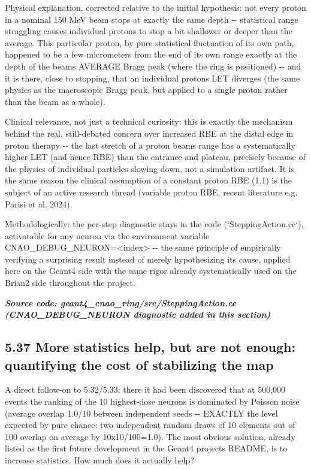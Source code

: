 \documentclass[
  english,
]{article}
\begin{document}
Physical explanation, corrected relative to the initial hypothesis: not every proton in a nominal 150 MeV beam stops at exactly the same depth -\/- statistical range straggling causes individual protons to stop a bit shallower or deeper than the average. This particular proton, by pure statistical fluctuation of its own path, happened to be a few micrometers from the end of its own range exactly at the depth of the beam\textquotesingle s AVERAGE Bragg peak (where the ring is positioned) -\/- and it is there, close to stopping, that an individual proton\textquotesingle s LET diverges (the same physics as the macroscopic Bragg peak, but applied to a single proton rather than the beam as a whole).

Clinical relevance, not just a technical curiosity: this is exactly the mechanism behind the real, still-debated concern over increased RBE at the distal edge in proton therapy -\/- the last stretch of a proton beam\textquotesingle s range has a systematically higher LET (and hence RBE) than the entrance and plateau, precisely because of the physics of individual particles slowing down, not a simulation artifact. It is the same reason the clinical assumption of a constant proton RBE (1.1) is the subject of an active research thread (variable proton RBE, recent literature e.g. Parisi et al. 2024).

Methodologically: the per-step diagnostic stays in the code (`SteppingAction.cc`), activatable for any neuron via the environment variable CNAO\_\allowbreak{}DEBUG\_\allowbreak{}NEURON=\textless index\textgreater{} -\/- the same principle of empirically verifying a surprising result instead of merely hypothesizing its cause, applied here on the Geant4 side with the same rigor already systematically used on the Brian2 side throughout the project.

\textit{\textbf{Source code: geant4\_\allowbreak{}cnao\_\allowbreak{}ring/src/SteppingAction.cc (CNAO\_\allowbreak{}DEBUG\_\allowbreak{}NEURON diagnostic added in this section)}}


\subsection{5.37 More statistics help, but are not enough: quantifying the cost of stabilizing the map}\label{more-statistics-help-but-are-not-enough-quantifying-the-cost-of-stabilizing-the-map}

A direct follow-on to 5.32/5.33: there it had been discovered that at 500,000 events the ranking of the 10 highest-dose neurons is dominated by Poisson noise (average overlap 1.0/10 between independent seeds -\/- EXACTLY the level expected by pure chance: two independent random draws of 10 elements out of 100 overlap on average by 10x10/100=1.0). The most obvious solution, already listed as the first future development in the Geant4 project\textquotesingle s README, is to increase statistics. How much does it actually help?
\end{document}

